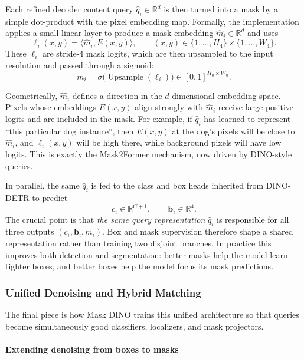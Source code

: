 \begin{enrichment}
\begin{enrichment}
		Each refined decoder content query $\hat q_i \in \mathbb{R}^d$ is then turned into a mask by a simple dot-product with the pixel embedding map.
		Formally, the implementation applies a small linear layer to produce a mask embedding $\hat m_i \in \mathbb{R}^d$ and uses
		\[
		\ell_i(x,y) = \langle \hat m_i, E(x,y) \rangle, \qquad
		(x,y) \in \{1,\dots,H_4\} \times \{1,\dots,W_4\}.
		\]
		These $\ell_i$ are stride-4 mask logits, which are then upsampled to the input resolution and passed through a sigmoid:
		\[
		m_i = \sigma\bigl(\operatorname{Upsample}(\ell_i)\bigr) \in [0,1]^{H_0 \times W_0}.
		\]
		
		Geometrically, $\hat m_i$ defines a direction in the $d$-dimensional embedding space.
		Pixels whose embeddings $E(x,y)$ align strongly with $\hat m_i$ receive large positive logits and are included in the mask.
		For example, if $\hat q_i$ has learned to represent ``this particular dog instance'', then $E(x,y)$ at the dog's pixels will be close to $\hat m_i$, and $\ell_i(x,y)$ will be high there, while background pixels will have low logits.
		This is exactly the Mask2Former mechanism, now driven by DINO-style queries.
		
		In parallel, the same $\hat q_i$ is fed to the class and box heads inherited from DINO-DETR to predict
		\[
		c_i \in \mathbb{R}^{C+1}, \qquad \mathbf{b}_i \in \mathbb{R}^4.
		\]
		The crucial point is that \emph{the same query representation} $\hat q_i$ is responsible for all three outputs $(c_i,\mathbf{b}_i,m_i)$.
		Box and mask supervision therefore shape a shared representation rather than training two disjoint branches.
		In practice this improves both detection and segmentation: better masks help the model learn tighter boxes, and better boxes help the model focus its mask predictions.
		
		
		\subsubsection{Unified Denoising and Hybrid Matching}
		
		The final piece is how Mask DINO trains this unified architecture so that queries become simultaneously good classifiers, localizers, and mask projectors.
		
		\paragraph{Extending denoising from boxes to masks}
		

\end{enrichment}
\end{enrichment}
